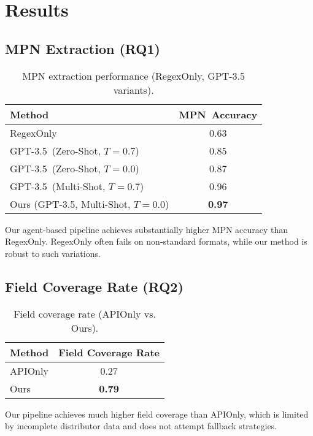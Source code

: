 \section{Results}
\subsection{MPN Extraction (RQ1)}
\begin{table}[H]
\centering
\caption{MPN extraction performance (RegexOnly, GPT-3.5 variants).}
\label{tab:mpn}
\begin{tabular}{lc}
\toprule
Method & MPN~Accuracy \\
\midrule
RegexOnly                        & 0.63 \\
GPT-3.5~(Zero-Shot, $T=0.7$)     & 0.85 \\
GPT-3.5~(Zero-Shot, $T=0.0$)     & 0.87 \\
GPT-3.5~(Multi-Shot, $T=0.7$)    & 0.96 \\
Ours (GPT-3.5, Multi-Shot, $T=0.0$)       & \textbf{0.97} \\
\bottomrule
\end{tabular}
\end{table}
Our agent-based pipeline achieves substantially higher MPN accuracy than RegexOnly. RegexOnly often fails on non-standard formats, while our method is robust to such variations.

\subsection{Field Coverage Rate (RQ2)}
\begin{table}[H]
\centering
\caption{Field coverage rate (APIOnly vs. Ours).}
\label{tab:coverage}
\begin{tabular}{lc}
\toprule
Method & Field Coverage Rate \\
\midrule
APIOnly   & 0.27 \\
Ours      & \textbf{0.79} \\
\bottomrule
\end{tabular}
\end{table}
Our pipeline achieves much higher field coverage than APIOnly, which is limited by incomplete distributor data and does not attempt fallback strategies.

